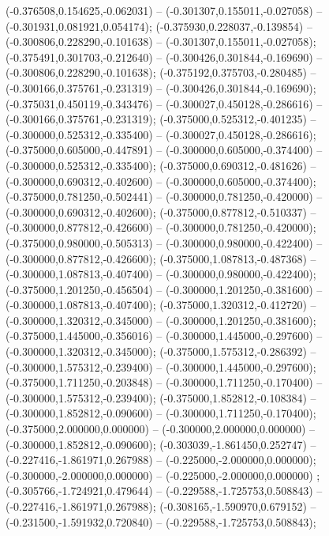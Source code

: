  (-0.376508,0.154625,-0.062031) -- (-0.301307,0.155011,-0.027058) -- (-0.301931,0.081921,0.054174);
 (-0.375930,0.228037,-0.139854) -- (-0.300806,0.228290,-0.101638) -- (-0.301307,0.155011,-0.027058);
 (-0.375491,0.301703,-0.212640) -- (-0.300426,0.301844,-0.169690) -- (-0.300806,0.228290,-0.101638);
 (-0.375192,0.375703,-0.280485) -- (-0.300166,0.375761,-0.231319) -- (-0.300426,0.301844,-0.169690);
 (-0.375031,0.450119,-0.343476) -- (-0.300027,0.450128,-0.286616) -- (-0.300166,0.375761,-0.231319);
 (-0.375000,0.525312,-0.401235) -- (-0.300000,0.525312,-0.335400) -- (-0.300027,0.450128,-0.286616);
 (-0.375000,0.605000,-0.447891) -- (-0.300000,0.605000,-0.374400) -- (-0.300000,0.525312,-0.335400);
 (-0.375000,0.690312,-0.481626) -- (-0.300000,0.690312,-0.402600) -- (-0.300000,0.605000,-0.374400);
 (-0.375000,0.781250,-0.502441) -- (-0.300000,0.781250,-0.420000) -- (-0.300000,0.690312,-0.402600);
 (-0.375000,0.877812,-0.510337) -- (-0.300000,0.877812,-0.426600) -- (-0.300000,0.781250,-0.420000);
 (-0.375000,0.980000,-0.505313) -- (-0.300000,0.980000,-0.422400) -- (-0.300000,0.877812,-0.426600);
 (-0.375000,1.087813,-0.487368) -- (-0.300000,1.087813,-0.407400) -- (-0.300000,0.980000,-0.422400);
 (-0.375000,1.201250,-0.456504) -- (-0.300000,1.201250,-0.381600) -- (-0.300000,1.087813,-0.407400);
 (-0.375000,1.320312,-0.412720) -- (-0.300000,1.320312,-0.345000) -- (-0.300000,1.201250,-0.381600);
 (-0.375000,1.445000,-0.356016) -- (-0.300000,1.445000,-0.297600) -- (-0.300000,1.320312,-0.345000);
 (-0.375000,1.575312,-0.286392) -- (-0.300000,1.575312,-0.239400) -- (-0.300000,1.445000,-0.297600);
 (-0.375000,1.711250,-0.203848) -- (-0.300000,1.711250,-0.170400) -- (-0.300000,1.575312,-0.239400);
 (-0.375000,1.852812,-0.108384) -- (-0.300000,1.852812,-0.090600) -- (-0.300000,1.711250,-0.170400);
 (-0.375000,2.000000,0.000000) -- (-0.300000,2.000000,0.000000) -- (-0.300000,1.852812,-0.090600);
 (-0.303039,-1.861450,0.252747) -- (-0.227416,-1.861971,0.267988) -- (-0.225000,-2.000000,0.000000);
 (-0.300000,-2.000000,0.000000) -- (-0.225000,-2.000000,0.000000) ;
 (-0.305766,-1.724921,0.479644) -- (-0.229588,-1.725753,0.508843) -- (-0.227416,-1.861971,0.267988);
 (-0.308165,-1.590970,0.679152) -- (-0.231500,-1.591932,0.720840) -- (-0.229588,-1.725753,0.508843);
